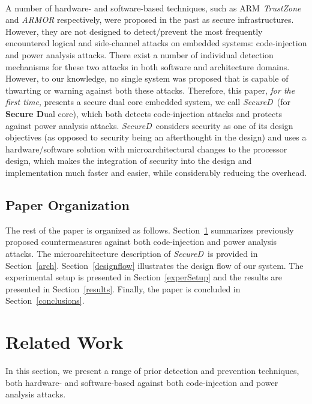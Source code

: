 \documentclass{article}
\newcommand{\reged}{\textsuperscript{\textregistered\ }}
\newcommand{\SecureD}{\emph{SecureD}}
\begin{document}
A number of hardware- and software-based  techniques, such         as
ARM\reged \emph{TrustZone}    \cite{armtrustzone}    and \emph{ARMOR}
\cite{armor} respectively, were proposed in the past as        secure
infrastructures. However, they are not designed to detect/prevent the
most frequently  encountered  logical  and  side-channel  attacks  on
embedded systems: code-injection and   power  analysis  attacks.
There exist a  number     of individual detection
mechanisms  for  these  two  attacks  in  both   software         and 
architecture domains. However, to our knowledge, no single system was
proposed that is  capable of thwarting or warning against both  these
attacks.
Therefore, this paper, \emph{for the first time},   presents a secure
dual core  embedded  system, we call \SecureD\ (for {\bf Secure D}ual
core),   which  both detects
code-injection  attacks  and   protects      against            power
analysis attacks. \SecureD\  considers security as one of its  design
objectives   (as     opposed to security being an afterthought in the
design) \cite{kocher04security} and uses a hardware/software solution
with microarchitectural changes to the  processor design, which makes
the integration  of  security into the design and implementation much
faster and easier, while considerably reducing the overhead.

\subsection*{Paper Organization}
The  rest of the paper is organized as follows. Section~\ref{relwork}
summarizes   previously      proposed countermeasures  against   both
code-injection and power analysis attacks. The      microarchitecture
description  of  \SecureD\        is  provided in Section~\ref{arch}.
Section~\ref{designflow} illustrates   the design flow of our system.
The experimental setup is presented in Section~\ref{experSetup}   and
the  results  are  presented  in Section~\ref{results}. Finally,  the
paper is concluded in Section~\ref{conclusions}.


\section{Related Work} \label{relwork}
In this section, we present a range of prior detection and prevention
techniques, both hardware- and software-based            against both
code-injection and power analysis attacks. 
\end{document}
